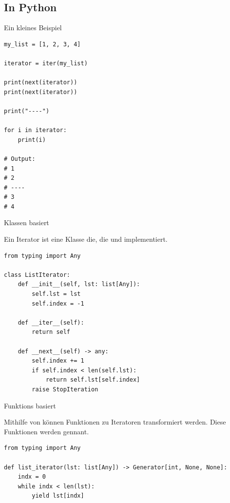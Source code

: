 \documentclass[12pt, aspectratio=169, usepdftitle=false]{beamer}
\newcommand{\pp}[1]{\lpl{#1}}
\begin{document}



\subsection{In Python}

\begin{frame}[fragile]{Ein kleines Beispiel}

    \begin{lstlisting}[language=pytiny]
my_list = [1, 2, 3, 4]

iterator = iter(my_list)

print(next(iterator))
print(next(iterator))

print("----")

for i in iterator:
    print(i)

# Output:
# 1
# 2
# ----
# 3
# 4
    \end{lstlisting}

\end{frame}

\begin{frame}[fragile]{Klassen basiert}

    Ein Iterator ist eine Klasse die, die  \pp{__iter()__} und \pp{__next()__} implementiert.

    \medskip

    \begin{lstlisting}[language=pytiny]
from typing import Any

class ListIterator:
    def __init__(self, lst: list[Any]):
        self.lst = lst
        self.index = -1

    def __iter__(self):
        return self

    def __next__(self) -> any:
        self.index += 1
        if self.index < len(self.lst):
            return self.lst[self.index]
        raise StopIteration

    \end{lstlisting}

\end{frame}

\begin{frame}[fragile]{Funktions basiert}

    Mithilfe von \pp{yield} können Funktionen zu Iteratoren transformiert werden. Diese Funktionen werden  gennant.

    \medskip

    \begin{lstlisting}[language=pytiny]
from typing import Any

def list_iterator(lst: list[Any]) -> Generator[int, None, None]:
    indx = 0
    while indx < len(lst):
        yield lst[indx]

    \end{lstlisting}

\end{frame}
\end{document}
